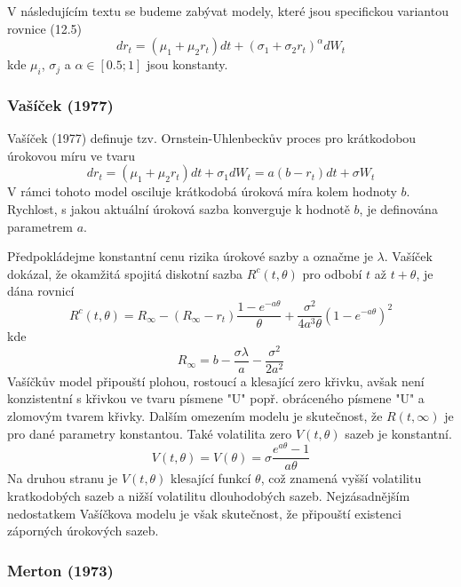 \documentclass[a4paper]{book}
\begin{document}
V následujícím textu se budeme zabývat modely, které jsou specifickou variantou rovnice (12.5)
\begin{equation*}
d r_t = (\mu_1 + \mu_2 r_t) dt + (\sigma_1 + \sigma_2 r_t)^{\alpha} dW_t
\end{equation*}
kde $\mu_i$, $\sigma_j$ a $\alpha \in [0.5; 1]$ jsou konstanty.

\subsubsection{Vašíček (1977)}

Vašíček (1977) definuje tzv. Ornstein-Uhlenbeckův proces pro krátkodobou úrokovou míru ve tvaru
\begin{equation*}
d r_t = (\mu_1 + \mu_2 r_t)dt + \sigma_1 dW_t = a(b - r_t)dt + \sigma W_t
\end{equation*}
V rámci tohoto model osciluje krátkodobá úroková míra kolem hodnoty $b$. Rychlost, s jakou aktuální úroková sazba konverguje k hodnotě $b$, je definována parametrem $a$.

Předpokládejme konstantní cenu rizika úrokové sazby a označme je $\lambda$. Vašíček dokázal, že okamžitá spojitá diskotní sazba $R^c(t, \theta)$ pro odbobí $t$ až $t + \theta$, je dána rovnicí
\begin{equation*}
R^c(t, \theta) = R_{\infty} - (R_{\infty} - r_t) \frac{1 - e^{-a\theta}}{\theta} + \frac{\sigma^2}{4a^3\theta}(1 - e^{-a\theta})^2
\end{equation*}
kde
\begin{equation*}
R_{\infty} = b - \frac{\sigma \lambda}{a} - \frac{\sigma^2}{2a^2}
\end{equation*}
Vašíčkův model připouští plohou, rostoucí a klesající zero křivku, avšak není konzistentní s křivkou ve tvaru písmene "U" popř. obráceného písmene "U" a zlomovým tvarem křivky. Dalším omezením modelu je skutečnost, že $R(t, \infty)$ je pro dané parametry konstantou. Také volatilita zero $V(t, \theta)$ sazeb je konstantní.
\begin{equation*}
V(t, \theta) = V(\theta) = \sigma \frac{e^{a \theta} - 1}{a \theta}
\end{equation*}
Na druhou stranu je $V(t, \theta)$ klesající funkcí $\theta$, což znamená vyšší volatilitu kratkodobých sazeb a nižší volatilitu dlouhodobých sazeb. Nejzásadnějším nedostatkem Vašíčkova modelu je však skutečnost, že připouští existenci záporných úrokových sazeb.

\subsubsection{Merton (1973)}
\end{document}
